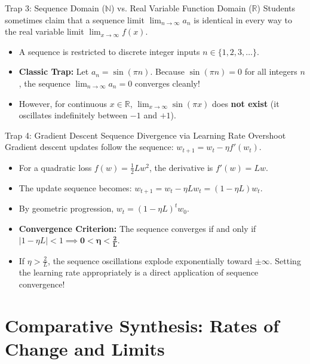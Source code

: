 \begin{trapbox}{Trap 3: Sequence Domain ($\mathbb{N}$) vs. Real Variable Function Domain ($\mathbb{R}$)}
Students sometimes claim that a sequence limit $\lim_{n \to \infty} a_n$ is identical in every way to the real variable limit $\lim_{x \to \infty} f(x)$.
\begin{itemize}
    \item A sequence is restricted to discrete integer inputs $n \in \{1, 2, 3, \dots\}$.
    \item \textbf{Classic Trap:} Let $a_n = \sin(\pi n)$. Because $\sin(\pi n) = 0$ for all integers $n$, the sequence $\lim_{n \to \infty} a_n = 0$ converges cleanly!
    \item However, for continuous $x \in \mathbb{R}$, $\lim_{x \to \infty} \sin(\pi x)$ does \textbf{not exist} (it oscillates indefinitely between $-1$ and $+1$).
\end{itemize}
\end{trapbox}

\begin{trapbox}{Trap 4: Gradient Descent Sequence Divergence via Learning Rate Overshoot}
Gradient descent updates follow the sequence: $w_{t+1} = w_t - \eta f'(w_t)$.
\begin{itemize}
    \item For a quadratic loss $f(w) = \frac{1}{2} L w^2$, the derivative is $f'(w) = L w$.
    \item The update sequence becomes: $w_{t+1} = w_t - \eta L w_t = (1 - \eta L) w_t$.
    \item By geometric progression, $w_t = (1 - \eta L)^t w_0$.
    \item \textbf{Convergence Criterion:} The sequence converges if and only if $|1 - \eta L| < 1 \implies \mathbf{0 < \eta < \frac{2}{L}}$.
    \item If $\eta > \frac{2}{L}$, the sequence oscillations explode exponentially toward $\pm \infty$. Setting the learning rate appropriately is a direct application of sequence convergence!
\end{itemize}
\end{trapbox}

\section{Comparative Synthesis: Rates of Change and Limits}

